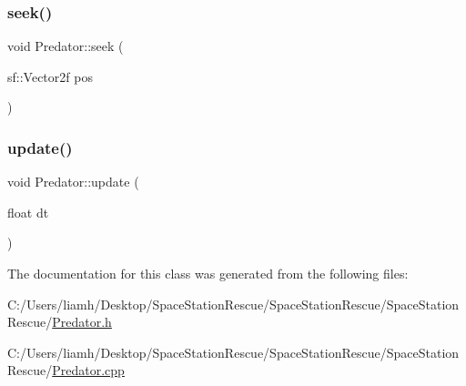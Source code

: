 \mbox{\label{class_predator_a7d1936de3c5d73264546002beecc4923}} 
\subsubsection{\texorpdfstring{seek()}{seek()}}
{\footnotesize\ttfamily void Predator\+::seek (\begin{DoxyParamCaption}\item[{sf\+::\+Vector2f}]{pos }\end{DoxyParamCaption})}

\mbox{\label{class_predator_a7070e47073a2a8f110b31d9cba00b35b}} 
\subsubsection{\texorpdfstring{update()}{update()}}
{\footnotesize\ttfamily void Predator\+::update (\begin{DoxyParamCaption}\item[{float}]{dt }\end{DoxyParamCaption})}



The documentation for this class was generated from the following files\+:\begin{DoxyCompactItemize}
\item 
C\+:/\+Users/liamh/\+Desktop/\+Space\+Station\+Rescue/\+Space\+Station\+Rescue/\+Space\+Station\+Rescue/\mbox{\hyperlink{_predator_8h}{Predator.\+h}}\item 
C\+:/\+Users/liamh/\+Desktop/\+Space\+Station\+Rescue/\+Space\+Station\+Rescue/\+Space\+Station\+Rescue/\mbox{\hyperlink{_predator_8cpp}{Predator.\+cpp}}\end{DoxyCompactItemize}
